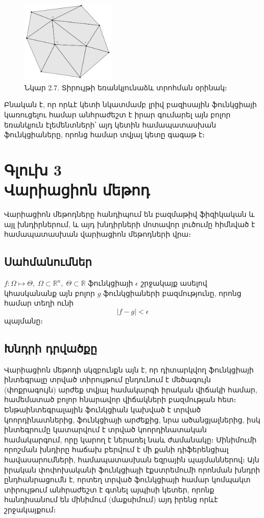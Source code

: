 \documentclass[fleqn, bachelor,subf,12pt,notitlepage]{article}
\begin{document}
\begin{figure}[h!]
\centering
\includegraphics[width=0.4\textwidth]{images/two_var_triangular}
\captionsetup{labelformat=empty}
\caption{\hfill Նկար 2.7. Տիրույթի եռանկյունաձև տրոհման օրինակ։}
\end{figure}

Բնական է, որ որևէ կետի նկատմամբ լրիվ բազիսային ֆունկցիայի կառուցելու համար անհրաժեշտ է իրար գումարել այն բոլոր եռանկյուն էլեմենտների՝ այդ կետին համապատասխան ֆունկցիաները, որոնց համար տվյալ կետը գագաթ է։
\newpage
\section*{\centering Գլուխ 3 \\ Վարիացիոն մեթոդ}

Վարիացիոն մեթոդները հանդիպում են բազմաթիվ ֆիզիկական և այլ խնդիրներում, և այդ խնդիրների մոտավոր լուծումը հիմնված է համապատասխան վարիացիոն մեթոդների վրա։

\subsection*{Սահմանումներ}
$f : \Omega \mapsto \Theta, \; \Omega \subset \mathbb{R}^{n}, \; \Theta \subset \mathbb{R}$ ֆունկցիայի $\epsilon$ շրջակայք ասելով կհասկանանք այն բոլոր $g$ ֆունկցիաների բազմությունը, որոնց համար տեղի ունի
$$ \left|f-g\right| < \epsilon$$
պայմանը։



\subsection*{Խնդրի դրվածքը}
\hspace{\parindent}Վարիացիոն մեթոդի սկզբունքն այն է, որ դիտարկվող ֆունկցիայի ինտեգրալը տրված տիրույթում ընդունում է մեծագույն (փոքրագույն) արժեք տվյալ համակարգի իրական վիճակի համար, համեմատած բոլոր հնարավոր վիճակների բազմության հետ։  Ենթաինտեգրալային ֆունկցիան կախված է տրված կոորդինատներից, ֆունկցիայի արժեքից, նրա ածանցյալներից, իսկ ինտեգրումը կատարվում է տրված կոորդինատական համակարգում, որը կարող է ներառել նաև ժամանակը։ Մինիմումի որոշման խնդիրը հաճախ բերվում է մի քանի դիֆերենցիալ հավասարումների, համապատասխան եզրային պայմաններով։  Այն իրական փոփոխականի ֆունկցիայի էքստրեմումի որոնման խնդրի ընդհանրացումն է, որտեղ տրված ֆունկցիայի համար կոմպակտ տիրույթում անհրաժեշտ է գտնել այպիսի կետեր, որոնք հանդիսանում են մինիմում (մաքսիմում) այդ իրենց որևէ շրջակայքում։
\end{document}
